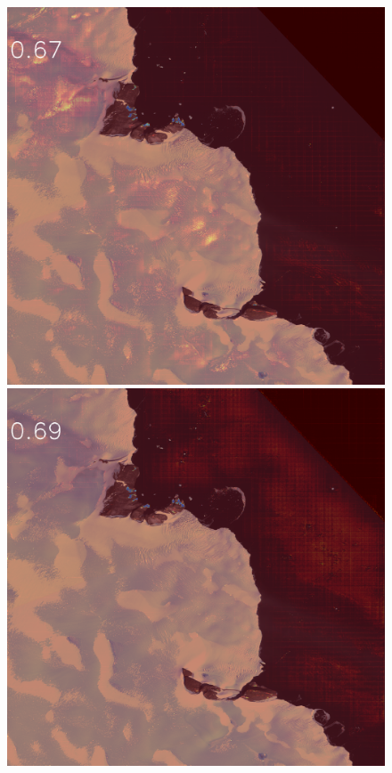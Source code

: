 \begin{figure}[h] 
\centering
{}
\\
\includegraphics[width=\subFigx]{./fig/datagrow/MSE_single_unet_train_1_1.txt_bias-1_bs128_do0.1e25/0.png}
\includegraphics[width=\subFigx]{./fig/datagrow/MSE_single_unet_train_1_2.txt_bias-1_bs128_do0.1e25/0.png}

\end{figure}
